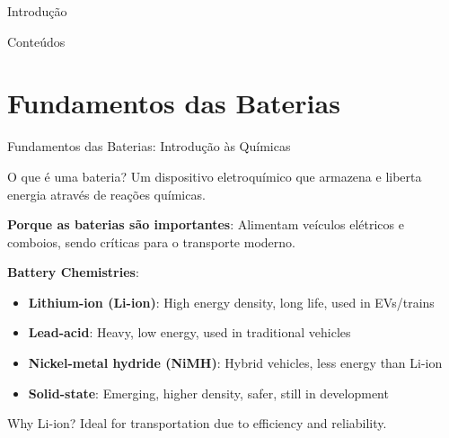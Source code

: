 \begin{frame}{Introdução}
\begin{frame}






\begin{frame}[plain]
  \titlepage
\end{frame}

\begin{frame}[plain]{Conteúdos}
  \tableofcontents
\end{frame}

\section{Fundamentos das Baterias}
\begin{frame}{Fundamentos das Baterias: Introdução às Químicas}
  \begin{block}{O que é uma bateria?}
    Um dispositivo eletroquímico que armazena e liberta energia através de reações químicas.
  \end{block}
  
  \textbf{Porque as baterias são importantes}: Alimentam veículos elétricos e comboios, sendo críticas para o transporte moderno.
  
  \vspace{0.3cm}
  
  \textbf{Battery Chemistries}:
  \begin{itemize}
    \item \textbf{Lithium-ion (Li-ion)}: High energy density, long life, used in EVs/trains
    \item \textbf{Lead-acid}: Heavy, low energy, used in traditional vehicles
    \item \textbf{Nickel-metal hydride (NiMH)}: Hybrid vehicles, less energy than Li-ion
    \item \textbf{Solid-state}: Emerging, higher density, safer, still in development
  \end{itemize}
  
  \begin{exampleblock}{Why Li-ion?}
    Ideal for transportation due to efficiency and reliability.
  \end{exampleblock}
\end{frame}


\end{frame}
\end{frame}
